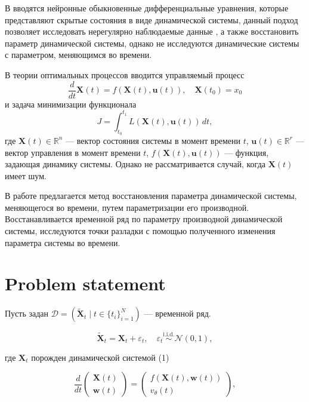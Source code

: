 \documentclass[a4paper,14pt]{article}
\theoremstyle{plain} %
\theoremstyle{definition} %
\theoremstyle{remark} %
\begin{document}
        В \citep{NEURIPS2018_69386f6b} вводятся нейронные обыкновенные дифференциальные уравнения, которые представляют скрытые состояния в виде динамической системы, данный подход позволяет исследовать нерегулярно наблюдаемые данные \citep{NEURIPS2019_42a6845a}, а также восстановить параметр динамической системы, однако не исследуются динамические системы с параметром, меняющимся во времени.

        В теории оптимальных процессов \citep{pontryagin} вводится управляемый процесс
        \begin{equation}
            \frac{d}{dt}\mathbf{X}(t) = f(\mathbf{X}(t), \mathbf{u}(t)), \quad \mathbf{X}(t_0) = x_0
        \end{equation}
        и задача минимизации функционала
         \begin{equation}
            J = \int_{t_0}^{t_1} L(\mathbf{X}(t), \mathbf{u}(t)) \, dt,
        \end{equation}
        где \( \mathbf{X}(t) \in \mathbb{R}^n \) — вектор состояния системы в момент времени \( t \), \( \mathbf{u}(t) \in \mathbb{R}^r \) — вектор управления в момент времени \( t \), \( f(\mathbf{X}(t), \mathbf{u}(t)) \) — функция, задающая динамику системы. Однако не рассматривается случай, когда $\mathbf{X}(t)$ имеет шум.

        В работе предлагается метод восстановления параметра динамической системы, меняющегося во времени, путем параметризации его производной. Восстанавливается временной ряд по параметру производной динамической системы, исследуются точки разладки с помощью полученного изменения параметра системы во времени.
        

        \section{Problem statement}
        Пусть задан \( \mathcal{D} = \left( \mathbf{\widetilde{X}}_t \mid t \in \{ t_i \}_{i=1}^N \right) \) — временной ряд. 
        
        \[
        \widetilde{\mathbf{X}}_t = \mathbf{X}_t + \varepsilon_t, \quad 
        \varepsilon_t \overset{\text{i.i.d.}}{\sim} \mathcal{N}(0, 1),
        \]
        
        где \( \mathbf{X}_t \) порожден динамической системой (1)
        
        \begin{equation}
        \frac{d}{dt}
        \begin{pmatrix}
        \mathbf{X}(t) \\
        \mathbf{w}(t)
        \end{pmatrix}
        =
        \begin{pmatrix}
        f(\mathbf{X}(t), \mathbf{w}(t)) \\
        v_\theta(t)
        \end{pmatrix},
        \end{equation}
        
\end{document}
